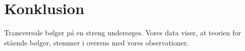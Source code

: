 \documentclass[A2_main.tex]{subfiles}
\begin{document}
\section{Konklusion}
Transversale bølger på en streng undersøges. Vores data viser, at teorien for stående bølger, stemmer i overens med vores observationer. 
\end{document}
